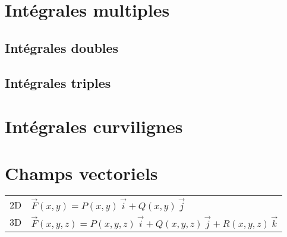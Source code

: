 % 

% 

% 



\section{Intégrales multiples}
\subsection{Intégrales doubles}


\subsection{Intégrales triples}


\section{Intégrales curvilignes}


\section{Champs vectoriels}
\begin{tabular}{ll}
    2D &  $\Vec{F}(x,y)= P(x,y)\,\Vec{i}+Q(x,y)\,\Vec{j}$\\ %
    3D &  $\Vec{F}(x,y,z)= P(x,y,z)\,\Vec{i}+Q(x,y,z)\,\Vec{j}+R(x,y,z)\,\Vec{k}$
\end{tabular}


